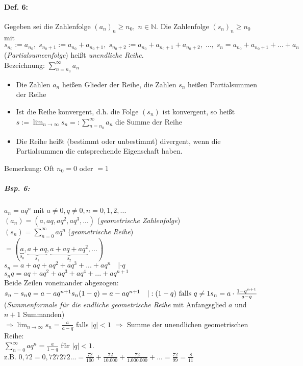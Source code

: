 \paragraph{Def. 6:} 
Gegeben sei die Zahlenfolge $(a_n)_n \geq n_0, \; n\in \mathbb{N}$. Die Zahlenfolge $(s_n)_n \geq n_0$ mit $s_{n_0}:=a_{n_0}, \; s_{n_0 + 1} := a_{n_0}+a_{n_0 +1}, \; s_{n_0 +2} := a_{n_0} + a_{n_0 +1} + a_{n_0 +2}, \; ..., \; s_n=a_{n_0}+a_{n_0 +1} +...+a_n$ (\emph{Partialsumeenfolge}) heißt \emph{unendliche Reihe}.\\
Bezeichnung: $\boxed{\sum_{n=n_0}^{\infty} a_n}$
\begin{itemize}
\item Die Zahlen $a_n$ heißen Glieder der Reihe, die Zahlen $s_n$ heißen Partialsummen der Reihe
\item Ist die Reihe konvergent, d.h. die Folge $(s_n)$ ist konvergent, so heißt $s:=\lim_{n\to \infty}s_n=: \sum_{n=n_0}^{\infty} a_n$ die Summe der Reihe
\item Die Reihe heißt (bestimmt oder unbestimmt) divergent, wenn die Partialsummen die entsprechende Eigenschaft haben.
\end{itemize}
Bemerkung: Oft $n_0=0$ oder $=1$
\subparagraph{Bsp. 6:} $a_n=a q^n$ mit $a\not = 0, q \not = 0, n=0,1,2,...$\\
$(a_n)=(a, aq, aq^2, aq^3,...)$ (\emph{geometrische Zahlenfolge})\\
$(s_n)=\sum_{n=0}^\infty aq^n$ (\emph{geometrische Reihe})\\
$= (\underbrace{a}_{s_0}, \underbrace{a+aq}_{s_1}, \underbrace{a+ aq+ aq^2}_{s_2}, ...)$\\
$s_n=a + aq + aq^2 + aq^3+...+aq^n \quad | \cdot q$\\
$s_nq=aq+aq^2+aq^3+aq^4+...+aq^{n+1}$\\
Beide Zeilen voneinander abgezogen:\\
$s_n-s_nq = a - aq^{n+1}\\
s_n(1-q) = a - aq^{n+1} \quad | : (1-q) \text{ falls }q\not = 1\\
s_n = a\cdot \frac{1-q^{n+1}}{a-q}$ (\emph{Summenformale für die endliche geometrische Reihe} mit Anfangsglied $a$ und $n+1$ Summanden)\\
$\Rightarrow \lim_{n\to \infty}s_n=\frac{a}{a-q}$ falls $|q|<1$
$\Rightarrow$ Summe der unendlichen geometrischen Reihe:\\
$\boxed{\sum_{n=0}^\infty a q^n=\frac{a}{1-q}}$ für $|q|<1$.\\
z.B. $0,\overline{72}=0,727272...=\frac{72}{100}+\frac{72}{10.000}+\frac{72}{1.000.000}+...=\frac{72}{99}=\frac{8}{11}$

